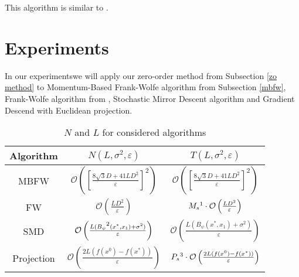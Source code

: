 \documentclass{article}
\begin{document}
        This algorithm is similar to \cite{akhtar2022zeroth}.
    
\section{Experiments}

    In our experiments\footnotemark we will apply our zero-order method from Subsection \ref{zo method} to Momentum-Based Frank-Wolfe algorithm from Subsection \ref{mbfw}, Frank-Wolfe algorithm from \cite{jaggi2013revisiting}, Stochastic Mirror Descent algorithm \cite{d2021stochastic} and Gradient Descend with Euclidean projection.


    \begin{table}[!ht]
        \centering
        \begin{tabular}{|c|c|c|}

        \hline
            Algorithm & $N(L, \sigma^2, \varepsilon)$ & $T(L, \sigma^2, \varepsilon)$\\ \hline 
            
            MBFW \cite{akhtar2022zeroth} & $\mathcal{O}\left(\left[\frac{8 \sqrt{3} D + 41 L D^2}{\varepsilon}\right]^2\right)$ & $\mathcal{O}\left(\left[\frac{8 \sqrt{3} D + 41 L D^2}{\varepsilon}\right]^2\right)$\\ [0.1cm]\hline

            FW \cite{frank1956algorithm} & $\mathcal{O}\left(\frac{LD^2}{\varepsilon}\right)$ & $M_s\footnotemark \cdot \mathcal{O}\left(\frac{LD^2}{\varepsilon} \right)$\\ [0.2cm]\hline 
            
            SMD \cite{d2021stochastic} & $\mathcal{O}\left(\frac{L(B_{\psi}\footnotemark (x^*, x_1) + \sigma^2)}{\varepsilon}\right)$ & $\mathcal{O}\left(\frac{L(B_{\psi}(x^*, x_1) + \sigma^2)}{\varepsilon}
            \right)$\\ [0.15cm] \hline

            Projection \cite{frei2007geometry} & $\mathcal{O}\left(\frac{2 L (f(x^0) - f(x^*))}{\varepsilon}\right)$ & $P_s\footnotemark \cdot \mathcal{O}\left(\frac{2 L (f(x^0) - f(x^*))}{\varepsilon}\right)$\\ [0.2cm] \hline 
        
        \end{tabular}\\
        
        \caption{$N$ and $L$ for considered algorithms}
    \end{table}
\end{document}
